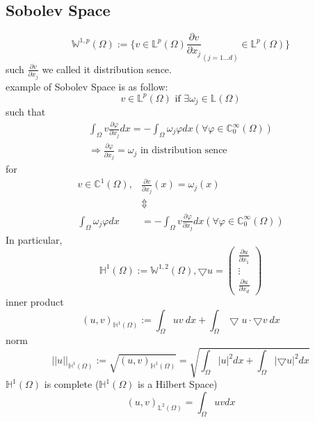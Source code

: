\documentclass[a4paper,12pt]{article}
\newcommand{\C}{\mathbb{C}}
\newcommand{\W}{\mathbb{W}}
\newcommand{\Hspace}{\mathbb{H}}
\newcommand{\Lspace}{\mathbb{L}}
\begin{document}
\subsection{Sobolev Space}
\begin{equation}
\W^{1,p}(\Omega) := \bigg\{v\in\Lspace^p(\Omega)\frac{\partial v}{\partial x_j}_{(j=1\dots d)}\in\Lspace^p(\Omega)\bigg\}
\end{equation}
such $\frac{\partial v}{\partial x_j}$ we called it distribution sence.\\
example of Sobolev Space is as follow:
\begin{equation}\nonumber
v \in \Lspace^p(\Omega) \text{ if } \exists \omega_j \in \Lspace(\Omega)
\end{equation}
such that
\begin{equation}\nonumber
\begin{aligned}
\int_\Omega v \frac{\partial \varphi}{\partial x_j} dx = -\int_\Omega \omega_j \varphi dx (\forall \varphi \in \C_0^\infty(\Omega))\\
\Rightarrow \frac{\partial \varphi}{\partial x_j} = \omega_j \text{ in distribution sence}
\end{aligned}
\end{equation}
for
\begin{equation}\nonumber
\begin{aligned}
v \in \C^1(\Omega), &\frac{\partial v}{\partial x_j} (x) = \omega_j(x)\\
&\Updownarrow\\
\int_\Omega \omega_j \varphi dx &= -\int_\Omega v \frac{\partial \varphi}{\partial x_j}dx (\forall \varphi \in \C_0^\infty(\Omega))
\end{aligned}
\end{equation}
In particular,
\begin{equation}\nonumber
\Hspace^1(\Omega) := \W^{1,2}(\Omega), \bigtriangledown u = \left(\begin{array}{c}
\frac{\partial u}{\partial x_1}\\
\vdots\\
\frac{\partial u}{\partial x_d}
\end{array}\right)
\end{equation}
inner product
\begin{equation}\nonumber
(u,v)_{\Hspace^1(\Omega)} := \int_\Omega uv\ dx + \int_\Omega \bigtriangledown u \cdot \bigtriangledown v\ dx
\end{equation}
norm
\begin{equation}\nonumber
||u||_{\Hspace^1(\Omega)} := \sqrt{(u,v)_{\Hspace^1(\Omega)}} = \sqrt{\int_\Omega|u|^2dx + \int_\Omega|\bigtriangledown u|^2dx}
\end{equation}
$\Hspace^1(\Omega)$ is complete ($\Hspace^1(\Omega)$ is a Hilbert Space)
\begin{equation}\nonumber
(u,v)_{\Lspace^2(\Omega)} = \int_\Omega uv dx
\end{equation}
\end{document}

